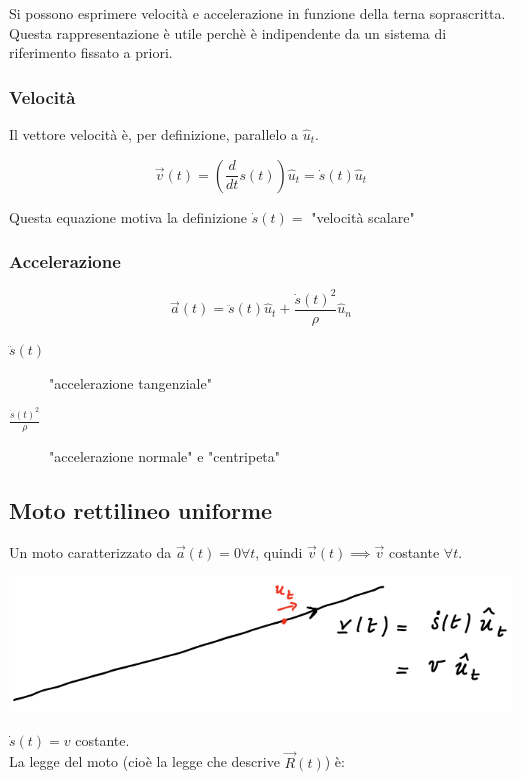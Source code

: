 \documentclass{subfiles}
\begin{document}
\noindent
Si possono esprimere velocità e accelerazione in funzione della terna soprascritta.
Questa rappresentazione è utile perchè è indipendente da un sistema di riferimento fissato a priori.

\subsubsection{Velocità}

Il vettore velocità è, per definizione, parallelo a $\hat{u}_t$.

$$
\vec{v}(t) = (\frac{d}{dt} s(t)) \hat{u}_t = \dot{s}(t)\hat{u}_t
$$

\noindent
Questa equazione motiva la definizione $\dot{s}(t) =$ "velocità scalare"

\subsubsection{Accelerazione}

$$
\vec{a}(t) = \ddot{s}(t)\hat{u}_t + \frac{\dot{s}(t)^2}{\rho}\hat{u}_n
$$

\begin{description}
    \item[$\ddot{s}(t)$] "accelerazione tangenziale"
    \item[$\frac{\dot{s}(t)^2}{\rho}$] "accelerazione normale" e "centripeta"
\end{description}

\subsection{Moto rettilineo uniforme}

Un moto caratterizzato da $\vec{a}(t) = 0 \forall t$, quindi $\vec{v}(t) \implies \vec{v}$ costante $\forall t$.

\includegraphics[width=\columnwidth]{esempio-moto-rettilineo-uniforme}

\noindent
$\dot{s}(t) = v$ costante.\\

\noindent
La legge del moto (cioè la legge che descrive $\vec{R}(t)$) è:
\end{document}
